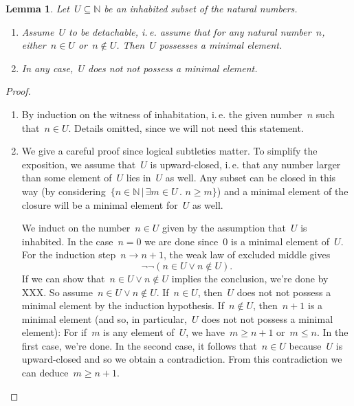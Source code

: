 \documentclass[10pt]{amsart}
\makeatletter
\theoremstyle{definition}
\theoremstyle{plain}
\newtheorem{lemma}[defn]{Lemma}
\theoremstyle{remark}
\newcommand{\NN}{\mathbb{N}}
\newcommand{\?}{\,{:}\,}
\renewcommand{\_}{\mathpunct{.}\,}
\newcommand{\ie}{i.\,e.\@\xspace}
\makeatother
\begin{document}
\begin{lemma}\label{lemma:minimum-subset-naturals}
Let~$U \subseteq \NN$ be an inhabited subset of the natural
numbers.
\begin{enumerate}
\item Assume~$U$ to be \emph{detachable}, \ie assume that for any natural
number~$n$, either~$n \in U$ or~$n \not\in U$. Then~$U$ possesses a minimal
element.
\item In any case,~$U$ does \emph{not not} possess a minimal element.
\end{enumerate}
\end{lemma}
\begin{proof}
\begin{enumerate}
\item By induction on the witness of inhabitation, \ie the given number~$n$ such
that~$n \in U$. Details omitted, since we will not need this statement.
\item We give a careful proof since logical subtleties matter. To simplify the
exposition, we assume that~$U$ is upward-closed, \ie that any number
larger than some element of~$U$ lies in~$U$ as well. Any subset can be closed
in this way (by considering~$\{ n \in \NN \,|\, \exists m \in U\_ n \geq m \}$)
and a minimal element of the closure will be a minimal element for~$U$ as well.

We induct on the number~$n \in U$ given by the assumption that~$U$ is
inhabited. In the case~$n = 0$ we are done since~$0$ is a minimal element
of~$U$. For the induction step~$n \to n+1$, the weak law of excluded middle
gives
\[ \neg\neg(n \in U \vee n \not\in U). \]
If we can show that~$n \in U \vee n \not\in U$ implies the conclusion, we're
done by XXX. So assume~$n \in U \vee n \not\in U$.
If~$n \in U$, then~$U$ does not not possess a minimal element by the induction
hypothesis. If~$n \not\in U$, then~$n+1$ is a minimal element (and so, in
particular,~$U$ does not not possess a minimal element): For if~$m$ is
any element of~$U$, we have~$m \geq n+1$ or~$m \leq n$. In the first case,
we're done. In the second case, it follows that~$n \in U$ because~$U$ is
upward-closed and so we obtain a contradiction. From this contradiction we can
deduce~$m \geq n+1$. \qedhere
\end{enumerate}
\end{proof}
\end{document}
